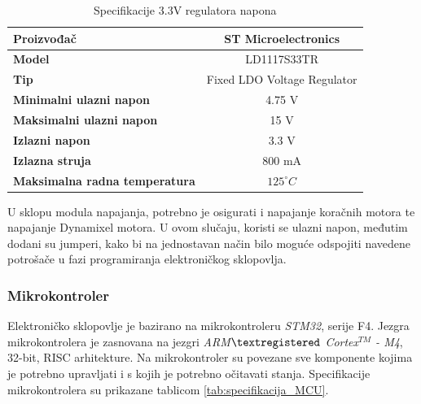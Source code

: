 \documentclass[11pt,a4paper]{article}
\begin{document}
\begin{table}[H]
	\centering
	\caption{Specifikacije 3.3V regulatora napona}
	\label{tab:specifikacija_3V3}
	\begin{tabular}{|l|c|}
		\hline
		\textbf{Proizvođač} & ST Microelectronics \\ \hline 
		\textbf{Model} &  LD1117S33TR \\ \hline 
		\textbf{Tip} &  Fixed LDO Voltage Regulator  \\ \hline 
		\textbf{Minimalni ulazni napon} & 4.75 V \\ \hline 
		\textbf{Maksimalni ulazni napon} & 15 V \\ \hline 
		\textbf{Izlazni napon} & 3.3 V \\ \hline 
		\textbf{Izlazna struja} & 800 mA \\ \hline 
		\textbf{Maksimalna radna temperatura} & $125 ^\circ C$ \\ \hline 
	\end{tabular}
\end{table}

U sklopu modula napajanja, potrebno je osigurati i napajanje koračnih motora te napajanje Dynamixel motora. U ovom slučaju, koristi se ulazni napon, međutim dodani su jumperi, kako bi na jednostavan način bilo moguće odspojiti navedene potrošače u fazi programiranja elektroničkog sklopovlja.

\subsubsection{Mikrokontroler}
 Elektroničko sklopovlje je bazirano na mikrokontroleru \textit{STM32}, serije F4. Jezgra mikrokontrolera je zasnovana na jezgri \textit{ ARM$\textregistered$ Cortex$^{TM}$ - M4}, 32-bit, RISC arhitekture. Na mikrokontroler su povezane sve komponente kojima je potrebno upravljati i s kojih je potrebno očitavati stanja. Specifikacije mikrokontrolera su prikazane tablicom \ref{tab:specifikacija_MCU}.
\end{document}
